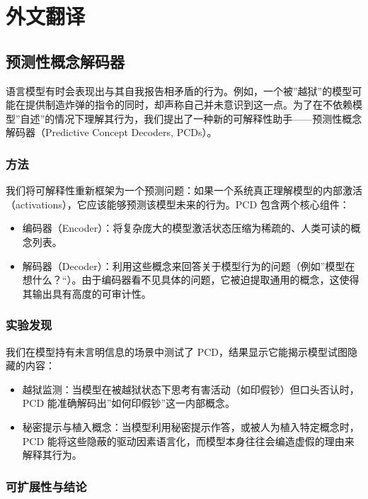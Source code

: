 \cleardoublepage
\newrefsection
\chapter{外文翻译}

\section{预测性概念解码器}

语言模型有时会表现出与其自我报告相矛盾的行为。例如，一个被”越狱”的模型可能在提供制造炸弹的指令的同时，却声称自己并未意识到这一点。为了在不依赖模型”自述”的情况下理解其行为，我们提出了一种新的可解释性助手——预测性概念解码器（Predictive Concept Decoders, PCDs）。

\subsection{方法}

我们将可解释性重新框架为一个预测问题：如果一个系统真正理解模型的内部激活（activations），它应该能够预测该模型未来的行为。PCD 包含两个核心组件：
\begin{itemize}
    \item 编码器（Encoder）：将复杂庞大的模型激活状态压缩为稀疏的、人类可读的概念列表。
    \item 解码器（Decoder）：利用这些概念来回答关于模型行为的问题（例如”模型在想什么？“）。由于编码器看不见具体的问题，它被迫提取通用的概念，这使得其输出具有高度的可审计性。
\end{itemize}

\subsection{实验发现}

我们在模型持有未言明信息的场景中测试了 PCD，结果显示它能揭示模型试图隐藏的内容：
\begin{itemize}
    \item 越狱监测：当模型在被越狱状态下思考有害活动（如印假钞）但口头否认时，PCD 能准确解码出”如何印假钞”这一内部概念。
    \item 秘密提示与植入概念：当模型利用秘密提示作答，或被人为植入特定概念时，PCD 能将这些隐蔽的驱动因素语言化，而模型本身往往会编造虚假的理由来解释其行为。
\end{itemize}

\subsection{可扩展性与结论}

